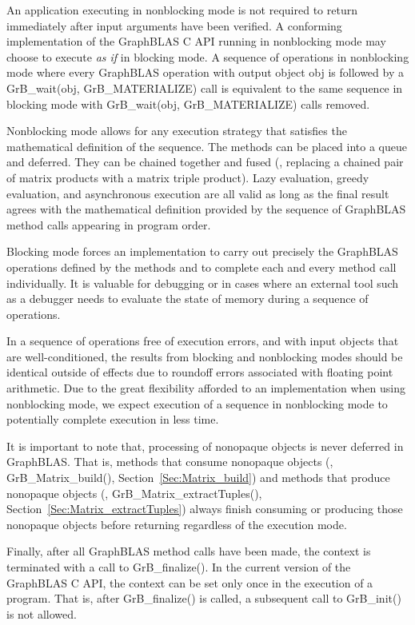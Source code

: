 An application executing in nonblocking mode is not required to return
immediately after input arguments have been verified. A conforming
implementation of the GraphBLAS C API running in nonblocking mode may
choose to execute {\it as if} in blocking mode.  A sequence of operations
in nonblocking mode where every GraphBLAS operation with output object
{\sf obj} is followed by a {\sf GrB\_wait(obj, GrB\_MATERIALIZE)} call is 
equivalent to the same sequence in blocking mode with {\sf GrB\_wait(obj, 
GrB\_MATERIALIZE)} calls removed.

Nonblocking mode allows for any execution strategy that satisfies the
mathematical definition of the sequence.  The methods can be placed
into a queue and deferred.  They can be chained together and fused
(\eg, replacing a chained pair of matrix products with a matrix triple
product).  Lazy evaluation, greedy evaluation, and asynchronous execution
are all valid as long as the final result agrees with the mathematical
definition provided by the sequence of GraphBLAS method calls appearing
in  program order.

Blocking mode forces an implementation to carry out precisely the
GraphBLAS operations defined by the methods and to complete each and
every method call individually.  It is valuable for debugging or in
cases where an external tool such as a debugger needs to evaluate the
state of memory during a sequence of operations.

In a sequence of operations free of execution errors, and with input
objects that are well-conditioned, the results from blocking and
nonblocking modes should be identical outside of effects due to roundoff
errors associated with floating point arithmetic.  Due to the great
flexibility afforded to an implementation when using nonblocking mode,
we expect execution of a sequence in nonblocking mode to potentially
complete execution in less time.

It is important to note that, processing of nonopaque objects is never deferred in
GraphBLAS. That is, methods that consume nonopaque objects (\eg, {\sf
GrB\_Matrix\_build()}, Section~\ref{Sec:Matrix_build}) and methods that
produce nonopaque objects (\eg, {\sf GrB\_Matrix\_extractTuples()},
Section~\ref{Sec:Matrix_extractTuples}) always finish consuming or
producing those nonopaque objects before returning regardless of the 
execution mode.

Finally, after all GraphBLAS method calls have been made, the context is terminated
with a call to {\sf GrB\_finalize()}.  In the current version of the
GraphBLAS C API, the context can be set only once in the execution of
a program. That is, after {\sf GrB\_finalize()} is called, a subsequent
call to {\sf GrB\_init()} is not allowed.

